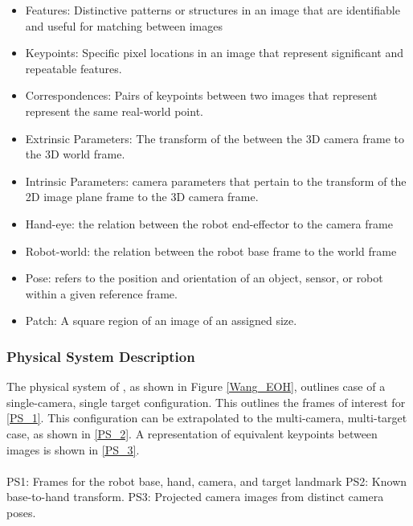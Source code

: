 \documentclass[12pt]{article}
\begin{document}
\begin{itemize}

\item Features: Distinctive patterns or structures in an image that are 
identifiable and useful for matching between images

\item Keypoints: Specific pixel locations in an image that represent 
significant and repeatable features.

\item Correspondences: Pairs of keypoints between two images that represent 
represent the same real-world point.

\item Extrinsic Parameters: The transform of the between the 3D camera frame to the 
3D world frame.

\item Intrinsic Parameters: camera parameters that pertain to the transform of the 
2D image plane frame to the 3D camera frame.

\item Hand-eye: the relation between the robot end-effector to the camera frame

\item Robot-world: the relation between the robot base frame to the world frame

\item Pose: refers to the position and orientation of an object, sensor, or robot 
within a given reference frame. 

\item Patch: A square region of an image of an assigned size.
\end{itemize}

\subsubsection{Physical System Description} \label{sec_phySystDescrip}
The physical system of \progname{}, as shown in Figure \ref{Wang_EOH}, outlines 
case of a single-camera, single target configuration. This outlines the frames of 
interest for \ref{PS_1}. This configuration can be extrapolated to the multi-camera, 
multi-target case, as shown in \ref{PS_2}. A representation of equivalent keypoints 
between images is shown in \ref{PS_3}.
\\
\\
\noindent \label{PS_1}PS1: Frames for the robot base, hand, camera, and target landmark
\noindent \label{PS_2}PS2: Known base-to-hand transform.
\noindent \label{PS_3}PS3: Projected camera images from distinct camera poses.
\end{document}
